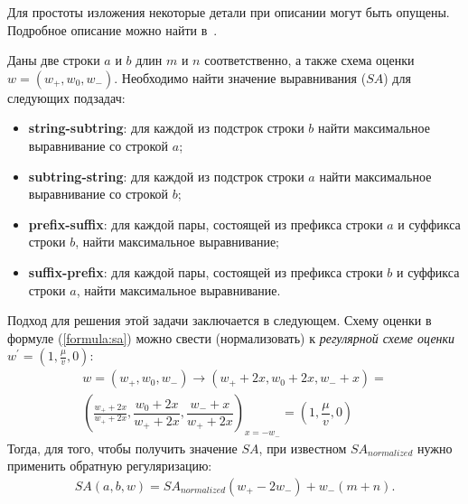 Для простоты изложения некоторые детали при описании могут быть опущены.
Подробное описание можно найти в~\cite{alex2007semilocal}.


\begin{definition}
Даны две строки $a$ и $b$ длин $m$ и $n$ соответственно, а также схема оценки $w = (w_{+}, w_{0} , w_{-})$. 
Необходимо найти значение выравнивания ($SA$) для следующих подзадач:
\begin{itemize}
\item \textbf{string-subtring}: для каждой из подстрок строки $b$ найти максимальное выравнивание со строкой $a$;
\item \textbf{subtring-string}: для каждой из подстрок строки $a$ найти максимальное выравнивание со строкой $b$;
\item \textbf{prefix-suffix}: для каждой пары, состоящей из префикса строки $a$ и суффикса строки $b$, найти максимальное выравнивание;
\item \textbf{suffix-prefix}: для каждой пары, состоящей из префикса строки $b$ и суффикса строки $a$, найти максимальное выравнивание. 
\end{itemize}
\end{definition}

Подход для решения этой задачи заключается в следующем.
Схему оценки в формуле (\ref{formula:sa}) можно свести (нормализовать) к \emph{регулярной схеме оценки} $w^{'} = (1,\frac{\mu}{v} ,0)$:
\begin{equation}\label{weightNormalization}
    \begin{aligned}
    w = (w_{+}, w_{0} , w_{-}) \xrightarrow{} (w_{+} +2x , w_{0} + 2x , w_{-} + x) =\\ ( \frac{w_{+} +2x}{w_{+} +2x} , \dfrac {w_{0} + 2x}{w_{+} +2x} , \dfrac{w_{-} + x}{w_{+} +2x})_{x=-w_{-}} = (1,\dfrac{\mu}{v} ,0) 
    \end{aligned}
\end{equation}
Тогда, для того, чтобы получить значение $SA$, при известном $SA_{normalized}$ нужно применить обратную регуляризацию:
\begin{equation}
    \begin{aligned}
    SA(a,b,w) = SA_{normalized}  (w_{+} - 2w_{-}) +  w_{-} (m + n).
    \end{aligned}
\end{equation}

